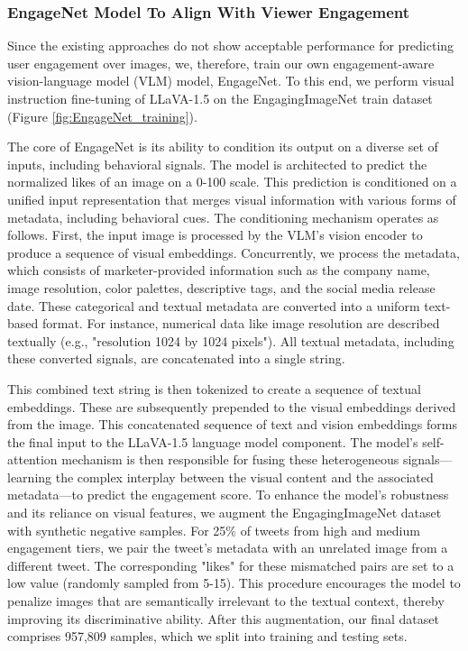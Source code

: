  

 \subsubsection{EngageNet Model To Align With Viewer Engagement}
 \label{sec:EngageNet}
 
 Since the existing approaches do not show acceptable performance for predicting user engagement over images, we, therefore, train our own engagement-aware vision-language model (VLM) model, EngageNet. To this end, we perform visual instruction fine-tuning of LLaVA-1.5 \cite{liu2023visual} on the EngagingImageNet train dataset (Figure \ref{fig:EngageNet_training}). 
 

The core of EngageNet is its ability to condition its output on a diverse set of inputs, including behavioral signals. The model is architected to predict the normalized likes of an image on a 0-100 scale. This prediction is conditioned on a unified input representation that merges visual information with various forms of metadata, including behavioral cues.
The conditioning mechanism operates as follows. First, the input image is processed by the VLM's vision encoder to produce a sequence of visual embeddings. Concurrently, we process the metadata, which consists of marketer-provided information such as the company name, image resolution, color palettes, descriptive tags, and the social media release date. These categorical and textual metadata are converted into a uniform text-based format. For instance, numerical data like image resolution are described textually (e.g., "resolution 1024 by 1024 pixels"). All textual metadata, including these converted signals, are concatenated into a single string.


This combined text string is then tokenized to create a sequence of textual embeddings. These are subsequently prepended to the visual embeddings derived from the image. This concatenated sequence of text and vision embeddings forms the final input to the LLaVA-1.5 language model component. The model's self-attention mechanism is then responsible for fusing these heterogeneous signals—learning the complex interplay between the visual content and the associated metadata—to predict the engagement score.
To enhance the model's robustness and its reliance on visual features, we augment the EngagingImageNet dataset with synthetic negative samples. For 25\% of tweets from high and medium engagement tiers, we pair the tweet's metadata with an unrelated image from a different tweet. The corresponding "likes" for these mismatched pairs are set to a low value (randomly sampled from 5-15). This procedure encourages the model to penalize images that are semantically irrelevant to the textual context, thereby improving its discriminative ability. After this augmentation, our final dataset comprises 957,809 samples, which we split into training and testing sets.

